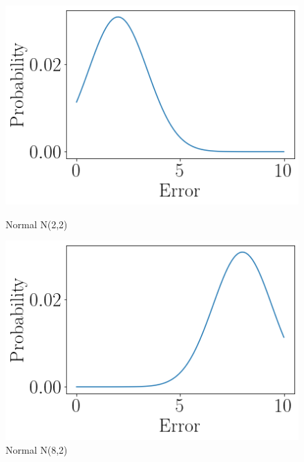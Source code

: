 \begin{figure}[ht]
\begin{minipage}[b]{0.5\linewidth}
        \includegraphics[width=\linewidth]{./img/distributions/normal_n_2_2.png}
        \caption{Normal N(2,2)}
        \vspace{4ex}
        \label{n_2_2_hist}
    \end{minipage}%
    \begin{minipage}[b]{0.5\linewidth}
        \centering
        \includegraphics[width=\linewidth]{./img/distributions/normal_n_8_2.png}
        \caption{Normal N(8,2)}
        \vspace{4ex}
    \end{minipage}
    \begin{minipage}[b]{0.5\linewidth}
        \centering

\end{minipage}
\end{figure}
